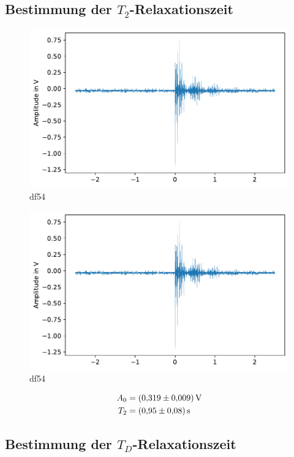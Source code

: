 \subsection{Bestimmung der $T_2$-Relaxationszeit}
\begin{figure}
    \center
    \includegraphics[scale = 1]{plots/df54.pdf}
    \caption{df54}
    \label{fig:df54}
\end{figure}
\begin{figure}
    \center
    \includegraphics[scale = 1]{plots/df54.pdf}
    \caption{df54}
    \label{fig:df54}
\end{figure}
\begin{align*}
    A_0 &= \SI{0.319 +- 0.009}{\volt}\\
    T_2 &= \SI{0.95 +- 0.08}{\second}
\end{align*}

\subsection{Bestimmung der $T_D$-Relaxationszeit}

